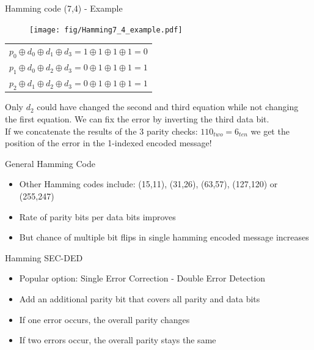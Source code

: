 \documentclass[aspectratio=169,hyperref={pdfpagelabels=false}]{beamer}
\begin{document}
    
    \begin{frame}{Hamming code (7,4) - Example}
    
    \begin{figure}
        \centering
        \texttt{[image: fig/Hamming7\_4\_example.pdf]}
    \end{figure}
    
    \begin{center}
    \begin{tabular}{c}
    $ p_0 \oplus d_0 \oplus d_1 \oplus d_3 = 1 \oplus 1 \oplus 1 \oplus 1 = 0$ \\
    $p_1 \oplus d_0 \oplus d_2 \oplus d_3 = 0 \oplus 1 \oplus 1 \oplus 1 = 1$ \\
    $p_2 \oplus d_1 \oplus d_2 \oplus d_3 = 0 \oplus 1 \oplus 1 \oplus 1 = 1$
    \end{tabular}
    \end{center}
    Only $d_2$ could have changed the second and third equation while not changing the first equation. We can fix the error by inverting the third data bit.\\\vspace{0.4cm}
    If we concatenate the results of the 3 parity checks: $110_{two} = 6_{ten}$ we get the position of the error in the 1-indexed encoded message!
    
    \end{frame}


\begin{frame}{General Hamming Code}
    \begin{itemize}
        \item Other Hamming codes include: (15,11), (31,26), (63,57), (127,120) or (255,247)
        \item Rate of parity bits per data bits improves
        \item But chance of multiple bit flips in single hamming encoded message increases
    \end{itemize}
\end{frame}

\begin{frame}{Hamming SEC-DED}
    \begin{itemize}
        \item Popular option: Single Error Correction - Double Error Detection
        \item Add an additional parity bit that covers all parity and data bits
        \item If one error occurs, the overall parity changes
        \item If two errors occur, the overall parity stays the same
    \end{itemize}
\end{frame}
\end{document}
